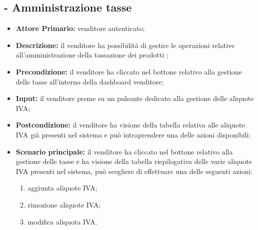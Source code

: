 \subsection{ - Amministrazione tasse}
\begin{itemize}
    \item \textbf{Attore Primario:} venditore autenticato;
    \item \textbf{Descrizione:} il venditore ha possibilità di gestire le operazioni relative all’amministrazione della tassazione dei prodotti ;
    \item \textbf{Precondizione:} il venditore ha cliccato nel bottone relativo alla gestione delle tasse all’interno della dashboard venditore;
    \item \textbf{Input:} il venditore preme su un pulsante dedicato alla gestione delle aliquote IVA;
    \item \textbf{Postcondizione:} il venditore ha visione della tabella relativa alle aliquote IVA già presenti nel sistema e può intraprendere una delle azioni disponibili;
    \item \textbf{Scenario principale:} il venditore ha cliccato nel bottone relativo alla gestione delle tasse e ha visione della tabella riepilogativa delle varie aliquote IVA presenti nel sistema, può scegliere di effettuare una delle seguenti azioni:
    \begin{enumerate}
        \item aggiunta aliquote IVA;
        \item rimozione aliquote IVA;
        \item modifica aliquota IVA.
    \end{enumerate}
\end{itemize}

\stepsubUserCase
